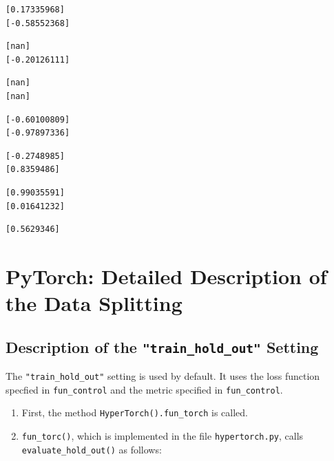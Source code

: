 \documentclass[
  letterpaper,
  DIV=11,
  numbers=noendperiod]{scrreprt}
\providecommand{\tightlist}{%
  \setlength{\itemsep}{0pt}\setlength{\parskip}{0pt}}\usepackage{longtable,booktabs,array}
\begin{document}
\begin{verbatim}
\end{verbatim}

\begin{verbatim}
[0.17335968]
[-0.58552368]
\end{verbatim}

\begin{verbatim}
[nan]
[-0.20126111]
\end{verbatim}

\begin{verbatim}
[nan]
[nan]
\end{verbatim}

\begin{verbatim}
[-0.60100809]
[-0.97897336]
\end{verbatim}

\begin{verbatim}
[-0.2748985]
[0.8359486]
\end{verbatim}

\begin{verbatim}
[0.99035591]
[0.01641232]
\end{verbatim}

\begin{verbatim}
[0.5629346]
\end{verbatim}

\newpage{}

\hypertarget{sec-detailed-data-splitting}{%
\section{PyTorch: Detailed Description of the Data
Splitting}\label{sec-detailed-data-splitting}}

\hypertarget{description-of-the-train_hold_out-setting}{%
\subsection{\texorpdfstring{Description of the
\texttt{"train\_hold\_out"}
Setting}{Description of the "train\_hold\_out" Setting}}\label{description-of-the-train_hold_out-setting}}

The \texttt{"train\_hold\_out"} setting is used by default. It uses the
loss function specfied in \texttt{fun\_control} and the metric specified
in \texttt{fun\_control}.

\begin{enumerate}
\def\labelenumi{\arabic{enumi}.}
\tightlist
\item
  First, the method \texttt{HyperTorch().fun\_torch} is called.
\item
  \texttt{fun\_torc()}, which is implemented in the file
  \texttt{hypertorch.py}, calls \texttt{evaluate\_hold\_out()} as
  follows:
\end{enumerate}
\end{document}

